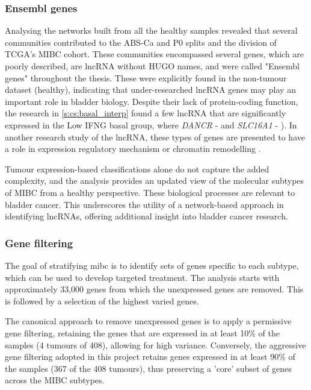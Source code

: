 \subsubsection*{Ensembl genes}

Analysing the networks built from all the healthy samples revealed that several communities contributed to the ABS-Ca and P0 splits and the division of TCGA's MIBC cohort. These communities encompassed several genes, which are poorly described, are \acrlong{lncRNA} without HUGO names, and were called "Ensembl genes" throughout the thesis. These were explicitly found in the non-tumour dataset (healthy), indicating that under-researched lncRNA genes may play an important role in bladder biology. Despite their lack of protein-coding function, the research in \cref{s:cs:basal_interp} found a few \acrlong{lncRNA} that are significantly expressed in the Low IFNG basal group, where \textit{DANCR} - \citep{Zhan2018-um} and \textit{SLC16A1} - \citet{Logotheti2020-ya}). In another research study of the \acrshort{lncRNA}, these types of genes are presented to have a role in expression regulatory mechanism or chromatin remodelling \citep{Statello2021-md}.  

Tumour expression-based classifications alone do not capture the added complexity, and the analysis provides an updated view of the molecular subtypes of MIBC from a healthy perspective. These biological processes are relevant to bladder cancer. This underscores the utility of a network-based approach in identifying lncRNAs, offering additional insight into bladder cancer research.


\subsubsection*{Gene filtering} \label{s:discussion:gene_filt}

The goal of stratifying \acrshort{mibc} is to identify sets of genes specific to each subtype, which can be used to develop targeted treatment. The analysis starts with approximately 33,000 genes from which the unexpressed genes are removed. This is followed by a selection of the highest varied genes.

The canonical approach to remove unexpressed genes is to apply a permissive gene filtering, retaining the genes that are expressed in at least 10\% of the samples (4 tumours of 408), allowing for high variance. Conversely, the aggressive gene filtering adopted in this project retains genes expressed in at least 90\% of the samples (367 of the 408 tumours), thus preserving a 'core' subset of genes across the \gls{MIBC} subtypes.


